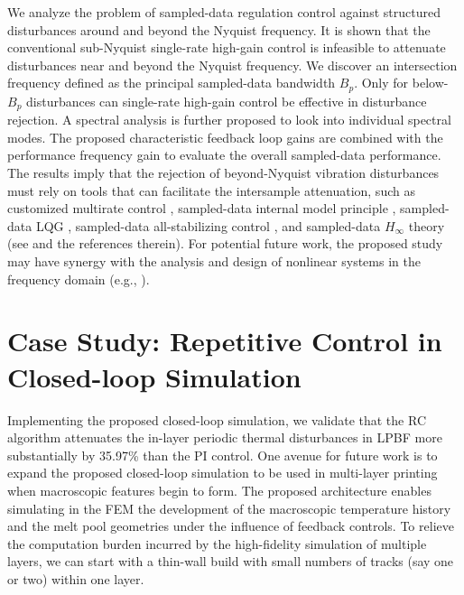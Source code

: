 \documentclass [11pt, proquest] {uwthesis}[2020/02/24]
\begin{document}
We analyze the problem of sampled-data regulation control against
structured disturbances around and beyond the Nyquist frequency. It is shown that the conventional sub-Nyquist single-rate
high-gain control is infeasible to attenuate disturbances near and
beyond the Nyquist frequency. We discover an intersection frequency
defined as the principal sampled-data bandwidth $B_{p}$. Only for
below-$B_{p}$ disturbances can single-rate high-gain control be effective
in disturbance rejection. A spectral analysis is further proposed
to look into individual spectral modes. The proposed characteristic
feedback loop gains are combined with the performance frequency gain
to evaluate the overall sampled-data performance. The results imply
that the rejection of beyond-Nyquist vibration disturbances must rely
on tools that can facilitate the intersample attenuation, such as
customized multirate control \cite{XuChen_beyondNyquist15}, sampled-data
internal model principle \cite{Fujioka:2011dy}, sampled-data LQG
\cite{Chen:1991cp}, sampled-data all-stabilizing control \cite{Ravi:1990eo},
and sampled-data $H_{\infty}$ theory (see \cite{Lall:2001cm} and
the references therein). For potential future work, the proposed study
may have synergy with the analysis and design of nonlinear systems
in the frequency domain (e.g., \cite{jing2015frequency,lang2007output,xiao2016frequency}).

\section*{Case Study: Repetitive Control in Closed-loop Simulation}

Implementing the proposed closed-loop simulation, we validate
that the RC algorithm attenuates the in-layer periodic thermal disturbances in LPBF
more substantially by 35.97\% than the PI control. One avenue for future work is to expand the proposed closed-loop simulation
to be used in multi-layer printing when macroscopic features begin
to form. The proposed architecture enables simulating in the FEM the
development of the macroscopic temperature history and the melt pool
geometries under the influence of feedback controls. To relieve the
computation burden incurred by the high-fidelity simulation of multiple
layers, we can start with a thin-wall build with small numbers of
tracks (say one or two) within one layer.

%
%


%
%
\appendix
\raggedbottom\sloppy
 
\end{document}
